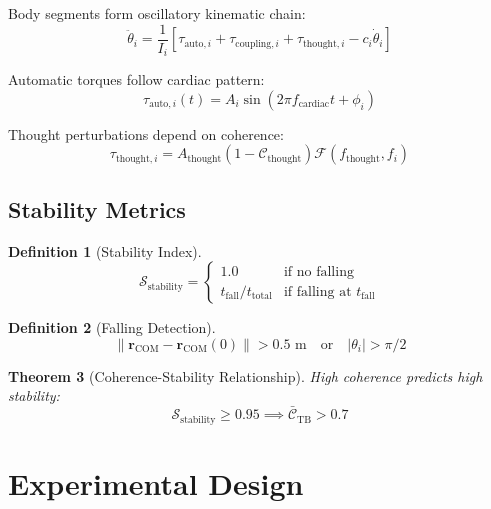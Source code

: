 \documentclass[12pt,twocolumn]{article}
\newtheorem{theorem}{Theorem}[section]
\newtheorem{definition}[theorem]{Definition}
\theoremstyle{remark}
\begin{document}
Body segments form oscillatory kinematic chain:
\begin{equation}
\ddot{\theta}_i = \frac{1}{I_i}\left[\tau_{\text{auto},i} + \tau_{\text{coupling},i} + \tau_{\text{thought},i} - c_i\dot{\theta}_i\right]
\end{equation}

Automatic torques follow cardiac pattern:
\begin{equation}
\tau_{\text{auto},i}(t) = A_i \sin(2\pi f_{\text{cardiac}} t + \phi_i)
\end{equation}

Thought perturbations depend on coherence:
\begin{equation}
\tau_{\text{thought},i} = A_{\text{thought}} (1 - \mathcal{C}_{\text{thought}}) \mathcal{F}(f_{\text{thought}}, f_i)
\end{equation}

\subsection{Stability Metrics}

\begin{definition}[Stability Index]
\begin{equation}
\mathcal{S}_{\text{stability}} = \begin{cases}
1.0 & \text{if no falling} \\
t_{\text{fall}}/t_{\text{total}} & \text{if falling at } t_{\text{fall}}
\end{cases}
\end{equation}
\end{definition}

\begin{definition}[Falling Detection]
\begin{equation}
\|\mathbf{r}_{\text{COM}} - \mathbf{r}_{\text{COM}}(0)\| > 0.5 \text{ m} \quad \text{or} \quad |\theta_i| > \pi/2
\end{equation}
\end{definition}

\begin{theorem}[Coherence-Stability Relationship]
High coherence predicts high stability:
\begin{equation}
\mathcal{S}_{\text{stability}} \geq 0.95 \implies \bar{\mathcal{C}}_{\text{TB}} > 0.7
\end{equation}
\end{theorem}

\section{Experimental Design}
\end{document}

